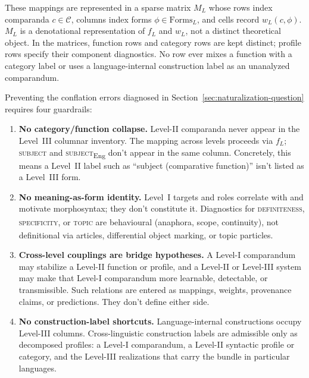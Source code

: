 \documentclass[12pt]{article}
\begin{document}
These mappings are represented in a sparse matrix $M_L$ whose rows index comparanda $c \in \mathcal{C}$, columns index forms $\phi \in \mathrm{Forms}_L$, and cells record $w_L(c,\phi)$. $M_L$ is a denotational representation of $f_L$ and $w_L$, not a distinct theoretical object. In the matrices, function rows and category rows are kept distinct; profile rows specify their component diagnostics. No row ever mixes a function with a category label or uses a language-internal construction label as an unanalyzed comparandum.

Preventing the conflation errors diagnosed in Section~\ref{sec:naturalization-question} requires four guardrails:
\begin{enumerate}[label=\textbf{Rule \Alph*:}, leftmargin=*, itemsep=2pt]
  \item \textbf{No category/function collapse.} Level-II comparanda never appear in the Level~III columnar inventory. The mapping across levels proceeds via $f_L$; \textsc{subject}\textsubscript{\Cross} and \textsc{subject}\textsubscript{Eng} don't appear in the same column. Concretely, this means a Level~II label such as \enquote{subject (comparative function)} isn't listed as a Level~III form.
  
  \item \textbf{No meaning-as-form identity.} Level~I targets and roles correlate with and motivate morphosyntax; they don't constitute it. Diagnostics for \textsc{definiteness}\textsubscript{\Cross}, \textsc{specificity}\textsubscript{\Cross}, or \textsc{topic}\textsubscript{\Cross} are behavioural (anaphora, scope, continuity), not definitional via articles, differential object marking, or topic particles.

  \item \textbf{Cross-level couplings are bridge hypotheses.} A Level-I comparandum may stabilize a Level-II function or profile, and a Level-II or Level-III system may make that Level-I comparandum more learnable, detectable, or transmissible. Such relations are entered as mappings, weights, provenance claims, or predictions. They don't define either side.

  \item \textbf{No construction-label shortcuts.} Language-internal constructions occupy Level-III columns. Cross-linguistic construction labels are admissible only as decomposed profiles: a Level-I comparandum, a Level-II syntactic profile or category, and the Level-III realizations that carry the bundle in particular languages.
\end{enumerate}
\end{document}
